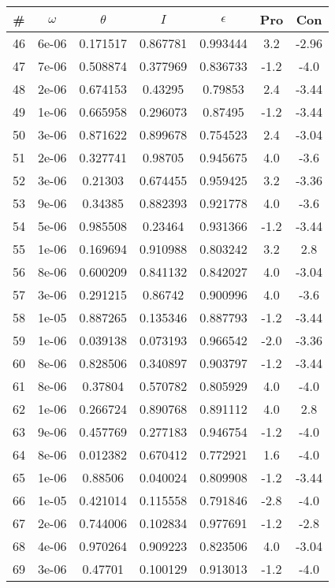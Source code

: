 \begin{table}
\begin{tabular}{c|c|c|c|c|c|c}
\# & $\omega$ & $\theta$ & $I$ & $\epsilon$ & Pro & Con\\
\hline
46 & 6e-06 & 0.171517 & 0.867781 & 0.993444 & 3.2 & -2.96\\
47 & 7e-06 & 0.508874 & 0.377969 & 0.836733 & -1.2 & -4.0\\
48 & 2e-06 & 0.674153 & 0.43295 & 0.79853 & 2.4 & -3.44\\
49 & 1e-06 & 0.665958 & 0.296073 & 0.87495 & -1.2 & -3.44\\
50 & 3e-06 & 0.871622 & 0.899678 & 0.754523 & 2.4 & -3.04\\
51 & 2e-06 & 0.327741 & 0.98705 & 0.945675 & 4.0 & -3.6\\
52 & 3e-06 & 0.21303 & 0.674455 & 0.959425 & 3.2 & -3.36\\
53 & 9e-06 & 0.34385 & 0.882393 & 0.921778 & 4.0 & -3.6\\
54 & 5e-06 & 0.985508 & 0.23464 & 0.931366 & -1.2 & -3.44\\
55 & 1e-06 & 0.169694 & 0.910988 & 0.803242 & 3.2 & 2.8\\
56 & 8e-06 & 0.600209 & 0.841132 & 0.842027 & 4.0 & -3.04\\
57 & 3e-06 & 0.291215 & 0.86742 & 0.900996 & 4.0 & -3.6\\
58 & 1e-05 & 0.887265 & 0.135346 & 0.887793 & -1.2 & -3.44\\
59 & 1e-06 & 0.039138 & 0.073193 & 0.966542 & -2.0 & -3.36\\
60 & 8e-06 & 0.828506 & 0.340897 & 0.903797 & -1.2 & -3.44\\
61 & 8e-06 & 0.37804 & 0.570782 & 0.805929 & 4.0 & -4.0\\
62 & 1e-06 & 0.266724 & 0.890768 & 0.891112 & 4.0 & 2.8\\
63 & 9e-06 & 0.457769 & 0.277183 & 0.946754 & -1.2 & -4.0\\
64 & 8e-06 & 0.012382 & 0.670412 & 0.772921 & 1.6 & -4.0\\
65 & 1e-06 & 0.88506 & 0.040024 & 0.809908 & -1.2 & -3.44\\
66 & 1e-05 & 0.421014 & 0.115558 & 0.791846 & -2.8 & -4.0\\
67 & 2e-06 & 0.744006 & 0.102834 & 0.977691 & -1.2 & -2.8\\
68 & 4e-06 & 0.970264 & 0.909223 & 0.823506 & 4.0 & -3.04\\
69 & 3e-06 & 0.47701 & 0.100129 & 0.913013 & -1.2 & -4.0\\

\end{tabular}
\end{table}
